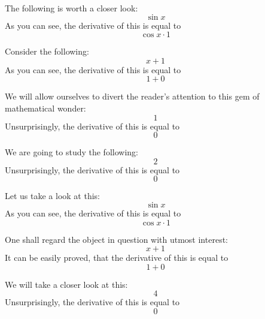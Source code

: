 \documentclass{article}
\begin{document}
The following is worth a closer look:
\begin{equation}
\sin x 
\end{equation}
As you can see, the derivative of this is equal to
\begin{equation}
\cos x \cdot 1 
\end{equation}

Consider the following:
\begin{equation}
x + 1 
\end{equation}
As you can see, the derivative of this is equal to
\begin{equation}
1 + 0 
\end{equation}

We will allow ourselves to divert the reader's attention to this gem of mathematical wonder:
\begin{equation}
1 
\end{equation}
Unsurprisingly, the derivative of this is equal to
\begin{equation}
0 
\end{equation}

We are going to study the following:
\begin{equation}
2 
\end{equation}
Unsurprisingly, the derivative of this is equal to
\begin{equation}
0 
\end{equation}

Let us take a look at this:
\begin{equation}
\sin x 
\end{equation}
As you can see, the derivative of this is equal to
\begin{equation}
\cos x \cdot 1 
\end{equation}

One shall regard the object in question with utmost interest:
\begin{equation}
x + 1 
\end{equation}
It can be easily proved, that the derivative of this is equal to
\begin{equation}
1 + 0 
\end{equation}

We will take a closer look at this:
\begin{equation}
4 
\end{equation}
Unsurprisingly, the derivative of this is equal to
\begin{equation}
0 
\end{equation}
\end{document}
